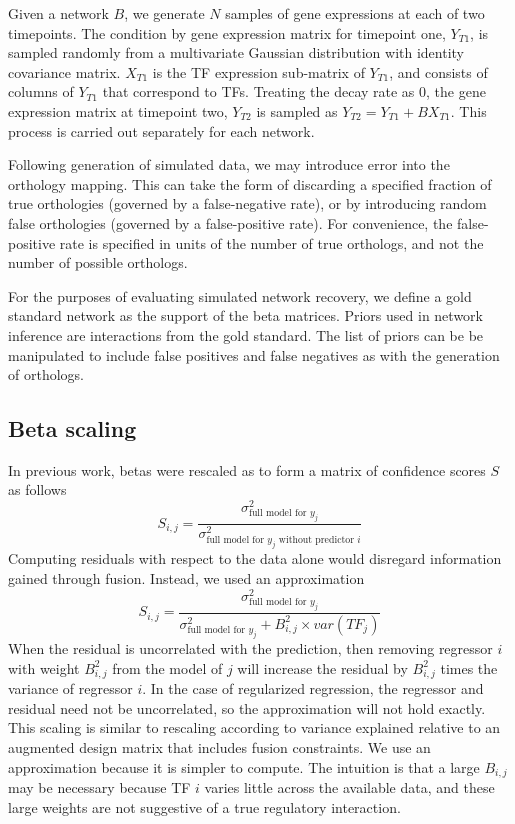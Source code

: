 \documentclass[11pt]{article}
\begin{document}
Given a network $B$, we generate $N$ samples of gene expressions at each of two timepoints. The condition by gene expression matrix for timepoint one, $Y_{T1}$, is sampled randomly from a multivariate Gaussian distribution with identity covariance matrix. $X_{T1}$ is the TF expression sub-matrix of $Y_{T1}$, and consists of columns of $Y_{T1}$ that correspond to TFs. Treating the decay rate as 0, the gene expression matrix at timepoint two, $Y_{T2}$ is sampled as $Y_{T2} = Y_{T1} + BX_{T1}$. This process is carried out separately for each network. 

Following generation of simulated data, we may introduce error into the orthology mapping. This can take the form of discarding a specified fraction of true orthologies (governed by a false-negative rate), or by introducing random false orthologies (governed by a false-positive rate). For convenience, the false-positive rate is specified in units of the number of true orthologs, and not the number of possible orthologs. 

For the purposes of evaluating simulated network recovery, we define a gold standard network as the support of the beta matrices. Priors used in network inference are interactions from the gold standard. The list of priors can be be manipulated to include false positives and false negatives as with the generation of orthologs. 

\subsection{Beta scaling}
In previous work, betas were rescaled as to form a matrix of confidence scores $S$ as follows
\begin{equation}
S_{i,j} = \frac{\sigma^2_{\text{full model for }y_j}}{\sigma^2_{\text{full model for }y_j \text{ without predictor }i}}
\end{equation}
Computing residuals with respect to the data alone would disregard information gained through fusion. Instead, we used an approximation
\begin{equation}
S_{i,j} = \frac{\sigma^2_{\text{full model for }y_j}}{\sigma^2_{\text{full model for }y_j} + B_{i,j}^2 \times var(TF_j)}
\end{equation}
When the residual is uncorrelated with the prediction, then removing regressor $i$ with weight $B_{i,j}^2$ from the model of $j$ will increase the residual by $B_{i,j}^2$ times the variance of regressor $i$. In the case of regularized regression, the regressor and residual need not be uncorrelated, so the approximation will not hold exactly. This scaling is similar to rescaling according to variance explained relative to an augmented design matrix that includes fusion constraints. We use an approximation because it is simpler to compute. The intuition is that a large $B_{i,j}$ may be necessary because TF $i$ varies little across the available data, and these large weights are not suggestive of a true regulatory interaction.
\end{document}
